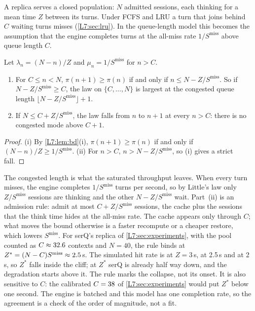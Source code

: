 A replica serves a closed population: $N$ admitted sessions, each thinking for a mean
time $Z$ between its turns. Under FCFS and LRU a turn that joins behind $C$ waiting turns
misses (\cref{L7:sec:lru}). In the queue-length model this becomes the assumption that the
engine completes turns at the all-miss rate $1/S^{\mathrm{miss}}$ above queue length $C$.

\begin{theorem}\label{L7:thm:open}
Let $\lambda_n=(N-n)/Z$ and $\mu_n=1/S^{\mathrm{miss}}$ for $n>C$.
\begin{enumerate}[label=(\roman*)]
\item For $C\le n<N$, $\pi(n+1)\ge\pi(n)$ if and only if $n\le N-Z/S^{\mathrm{miss}}$. So if
  $N-Z/S^{\mathrm{miss}}\ge C$, the law on $\{C,\dots,N\}$ is largest at the congested queue
  length $\lfloor N-Z/S^{\mathrm{miss}}\rfloor+1$.
\item If $N\le C+Z/S^{\mathrm{miss}}$, the law falls from $n$ to $n+1$ at every $n>C$: there
  is no congested mode above $C+1$.
\end{enumerate}
\end{theorem}
\begin{proof}
(i) By \cref{L7:lem:bd}(i), $\pi(n+1)\ge\pi(n)$ if and only if $(N-n)/Z\ge1/S^{\mathrm{miss}}$.
(ii) For $n>C$, $n>N-Z/S^{\mathrm{miss}}$, so (i) gives a strict fall.
\end{proof}

The congested length is what the saturated throughput leaves. When every turn misses,
the engine completes $1/S^{\mathrm{miss}}$ turns per second, so by Little's law only
$Z/S^{\mathrm{miss}}$ sessions are thinking and the other $N-Z/S^{\mathrm{miss}}$ wait.
Part~(ii) is an admission rule: admit at most $C+Z/S^{\mathrm{miss}}$ sessions, the cache
plus the sessions that the think time hides at the all-miss rate. The cache appears only
through $C$; what moves the bound otherwise is a faster recompute or a cheaper restore,
which lowers $S^{\mathrm{miss}}$. For serQ's replica of \cref{L7:sec:experiments}, with
the pool counted as $C\approx32.6$ contexts and $N=40$, the rule binds at
$Z^*=(N-C)S^{\mathrm{miss}}\approx2.5$\,s. The simulated hit rate is
\metaSqHitAtThree{} at $Z=3$\,s, \metaSqHitAtTwoHalf{} at 2.5\,s and \metaSqHitAtTwo{} at
2\,s, so $Z^*$ falls inside the cliff; at $Z^*$ serQ is already half way down, and the
degradation starts above it. The rule marks the collapse, not its onset. It is also
sensitive to $C$: the calibrated $C=38$ of \cref{L7:sec:experiments} would put
$Z^*$ below one second. The engine is batched and this model has one completion rate, so
the agreement is a check of the order of magnitude, not a fit.


